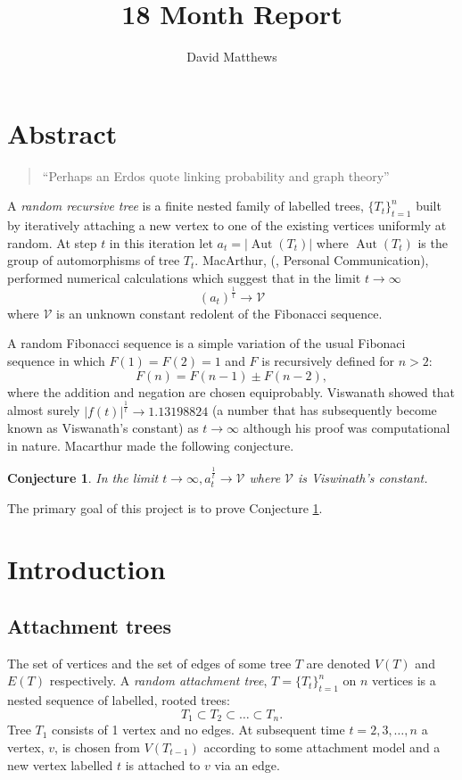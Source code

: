 \documentclass[oneside]{book} %
\title{18 Month Report}
\author{David Matthews}
\newtheorem{con}[thm]{Conjecture}
\theoremstyle{definition}
\numberwithin{equation}{section}
\DeclareMathOperator{\Aut}{Aut} %
\begin{document}
\tableofcontents
\chapter*{\centering Abstract}\label{sec:intro}
\begin{quotation}
 ``Perhaps an Erdos quote linking probability and graph theory'' 
\end{quotation}
A \emph{random recursive tree} is a finite nested family of labelled trees, $\{T_t\}_{t=1}^{n}$ built by iteratively attaching
a new vertex to one of the existing vertices uniformly at random. At step $t$ in this iteration let
$a_t = \lvert \Aut(T_t) \rvert$ where $\Aut(T_t)$ is the group of automorphisms of tree $T_t$.  MacArthur, (\cite{Bens}, Personal Communication), performed numerical calculations which suggest that in the limit $t \rightarrow \infty$
\[(a_t)^\frac{1}{t} \rightarrow \mathcal{V} \]
where $\mathcal{V}$ is an unknown constant redolent of the Fibonacci sequence.

A random Fibonacci sequence is a simple variation of the usual Fibonaci sequence in which $F(1) = F(2) = 1$ and $F$ is recursively defined for $n>2$:
\[F(n) = F(n-1) \pm F(n-2), \]
where the addition and negation are chosen equiprobably.  Viswanath \cite{Viswanath} showed that almost surely 
$|f(t)|^{\frac{1}{t}} \rightarrow 1.13198824 $ (a number that has subsequently become known as Viswanath's constant) as 
$t\rightarrow\infty$ although his proof was computational in nature.   Macarthur made the following conjecture.

\begin{con}\label{conj:1}
In the limit $t \rightarrow \infty, a_t^\frac{1}{t} \rightarrow \mathcal{V} $ where $\mathcal{V}$ is Viswinath's constant.  
\end{con}

The primary goal of this project is to prove Conjecture \ref{conj:1}.
   
\chapter{Introduction}\label{sec:background}
\section{Attachment trees}\label{sec:att}
The set of vertices and the set of edges of some tree $T$ are denoted $V(T)$ and $E(T)$ respectively.  
A \emph{random attachment tree}, $T = \{T_t\}_{t=1}^n$ on $n$ vertices is a nested sequence of  labelled, rooted trees:
\[T_{1} \subset T_{2} \subset \dots \subset T_{n}.\]
Tree $T_{1}$ consists of 1 vertex and no edges. At subsequent time $t = 2,3,\dots,n$ a vertex, $v$, is chosen from 
$V(T_{t-1})$ according to some attachment model and a new vertex labelled $t$ is attached to $v$ via an edge. 
\end{document}
